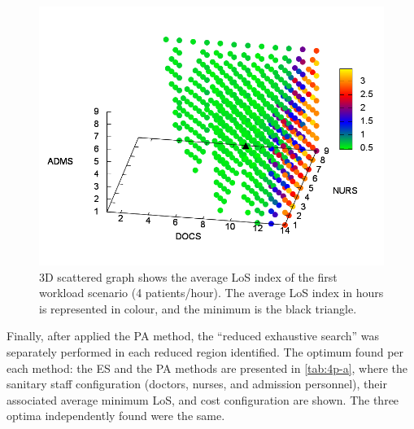\documentclass[11pt]{article} %
\begin{document}
\begin{figure}[h]
\noindent \begin{centering}
\includegraphics[width=0.95\columnwidth,height=0.2\paperheight]{figs4/v0/6400-602-25-3D-scatter-LoS2}
\par\end{centering}

\caption{3D scattered graph shows the average LoS index of the first workload
scenario (4 patients/hour). The average LoS index in hours is represented
in colour, and the minimum is the black triangle.\label{fig:3D-scattered-graph-25} }
\end{figure}


Finally, after applied the PA method, the \textquotedblleft{}reduced exhaustive search\textquotedblright{}
was separately performed in each reduced region identified. The optimum
found per each method: the ES and the PA
methods are presented in \ref{tab:4p-a}, where the sanitary staff
configuration (doctors, nurses, and admission personnel), their associated
average minimum LoS, and cost configuration are shown. The three optima
independently found were the same. 
\end{document}

